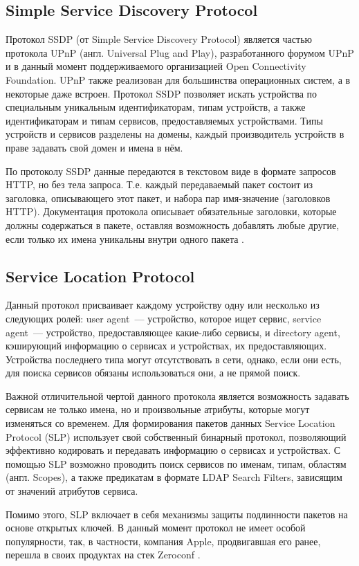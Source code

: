 \subsection{Simple Service Discovery Protocol}
Протокол SSDP (от Simple Service Discovery Protocol) является частью протокола UPnP (англ. Universal Plug and Play), разработанного форумом UPnP и в данный момент поддерживаемого организацией Open Connectivity Foundation.
UPnP также реализован для большинства операционных систем, а в некоторые даже встроен.
Протокол SSDP позволяет искать устройства по специальным уникальным идентификаторам, типам устройств, а также идентификаторам и типам сервисов, предоставляемых устройствами.
Типы устройств и сервисов разделены на домены, каждый производитель устройств в праве задавать свой домен и имена в нём.

По протоколу SSDP данные передаются в текстовом виде в формате запросов HTTP, но без тела запроса.
Т.е. каждый передаваемый пакет состоит из заголовка, описывающего этот пакет, и набора пар имя-значение (заголовков HTTP).
Документация протокола описывает обязательные заголовки, которые должны содержаться в пакете, оставляя возможность добавлять любые другие, если только их имена уникальны внутри одного пакета \cite{web:upnp}.

\subsection{Service Location Protocol}
Данный протокол присваивает каждому устройству одну или несколько из следующих ролей: user agent~--- устройство, которое ищет сервис, service agent~--- устройство, предоставляющее какие-либо сервисы, и directory agent, кэширующий информацию о сервисах и устройствах, их предоставляющих.
Устройства последнего типа могут отсутствовать в сети, однако, если они есть, для поиска сервисов обязаны использоваться они, а не прямой поиск.

Важной отличительной чертой данного протокола является возможность задавать сервисам не только имена, но и произвольные атрибуты, которые могут изменяться со временем.
Для формирования пакетов данных Service Location Protocol (SLP) использует свой собственный бинарный протокол, позволяющий эффективно кодировать и передавать информацию о сервисах и устройствах.
С помощью SLP возможно проводить поиск сервисов по именам, типам, областям (англ. Scopes), а также предикатам в формате LDAP Search Filters, зависящим от значений атрибутов сервиса.

Помимо этого, SLP включает в себя механизмы защиты подлинности пакетов на основе открытых ключей. 
В данный момент протокол не имеет особой популярности, так, в частности, компания Apple, продвигавшая его ранее, перешла в своих продуктах на стек Zeroconf \cite{web:slp}.

